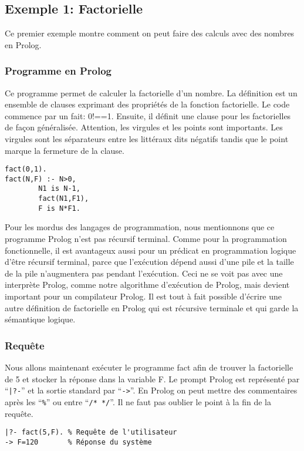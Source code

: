 \subsection{Exemple 1: Factorielle}

Ce premier exemple montre comment on peut faire des calculs avec des nombres en Prolog.

\subsubsection{Programme en Prolog}

Ce programme permet de calculer la factorielle d'un nombre.
La définition est un ensemble de clauses exprimant des propriétés de la fonction factorielle.
Le code commence par un fait: 0!==1.
Ensuite, il définit une clause pour les factorielles de façon généralisée.
Attention, les virgules et les points sont importants.
Les virgules sont les séparateurs entre les littéraux dits négatifs tandis que le point marque la fermeture de la clause.
\begin{verbatim}
fact(0,1).
fact(N,F) :- N>0, 
        N1 is N-1,
        fact(N1,F1), 
        F is N*F1.
\end{verbatim}
Pour les mordus des langages de programmation, nous mentionnons que ce programme Prolog n'est pas
récursif terminal.  Comme pour la programmation fonctionnelle, il est avantageux aussi pour un prédicat
en programmation logique
d'être récursif terminal, parce que l'exécution dépend aussi d'une pile
et la taille de la pile n'augmentera pas pendant l'exécution.
Ceci ne se voit pas avec une interprète Prolog, comme notre algorithme d'exécution de Prolog, mais devient important pour
un compilateur Prolog.
Il est tout à fait possible d'écrire une autre définition de factorielle en Prolog qui est récursive terminale
et qui garde la sémantique logique.

\subsubsection{Requête}

Nous allons maintenant exécuter le programme fact afin de trouver la factorielle de 5 et stocker la réponse dans la variable F.
Le prompt Prolog est représenté par ``\verb+|?-+'' et la sortie standard par ``\verb+->+''.
En Prolog on peut mettre des commentaires après les ``\verb+%+'' ou entre ``\verb+/* */+''.
Il ne faut pas oublier le point à la fin de la requête.
\begin{verbatim} 
|?- fact(5,F). % Requête de l'utilisateur
-> F=120       % Réponse du système
\end{verbatim}

